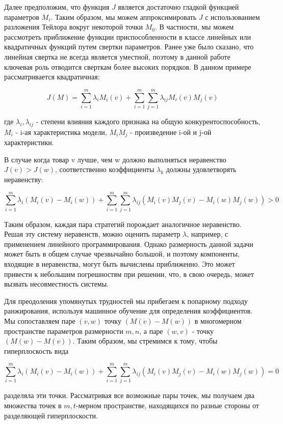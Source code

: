\documentclass[14pt, a4paper]{extarticle}
\begin{document}
  Далее предположим, что функция \( J \) является достаточно гладкой функцией параметров \( M_i \). Таким образом, мы можем аппроксимировать \( J \) с использованием разложения Тейлора вокруг некоторой точки \( M_0 \). В частности, мы можем рассмотреть приближение функции приспособленности в классе линейных или квадратичных функций путем свертки параметров. Ранее уже было сказано, что линейная свертка не всегда является уместной, поэтому в данной работе ключевая роль отводится сверткам более высоких порядков. В данном примере рассматривается квадратичная:
  
  \[
  J(M) = \sum_{i=1}^m \lambda_i M_i(v) + \sum_{i=1}^m \sum_{j=1}^m \lambda_{ij} M_i(v) M_j(v)
  \]
  
  где \( \lambda_i, \lambda_{ij} \) - степени влияния каждого признака на общую конкурентоспособность, \( M_i \) - i-ая характеристика модели, \( M_iM_j \) - произведение i-ой и j-ой характеристики.
  
  В случае когда товар v лучше, чем w должно выполняться неравенство \( J(v) > J(w) \), соответственно коэффициенты \( \lambda_k \) должны удовлетворять неравенству:
  
  \[
  \sum_{i=1}^m \lambda_i(M_i(v) - M_i(w)) + \sum_{i=1}^m \sum_{j=1}^m \lambda_{ij} (M_i(v) M_j(v) - M_i(w) M_j(w)) > 0
  \]
  
  Таким образом, каждая пара стратегий порождает аналогичное неравенство. Решая эту систему неравенств, можно оценить параметр \( \lambda \), например, с применением линейного программирования. Однако размерность данной задачи может быть в общем случае чрезвычайно большой, и поэтому компоненты, входящие в неравенства, могут быть вычислены приближенно. Это может привести к небольшим погрешностям при решении, что, в свою очередь, может вызвать несовместность системы.

Для преодоления упомянутых трудностей мы прибегаем к попарному подходу ранжирования, используя машинное обучение для определения коэффициентов. Мы сопоставляем паре \( (v, w) \) точку \( (M(v) - M(w)) \) в многомерном пространстве параметров размерности \( m, n \), а паре \( (w, v) \) - точку \( (M(w) - M(v)) \). Таким образом, мы стремимся к тому, чтобы гиперплоскость вида

\[
\sum_{i=1}^m \lambda_i(M_i(v) - M_i(w)) + \sum_{i=1}^m \sum_{j=1}^m \lambda_{ij}(M_i(v)M_j(v) - M_i(w)M_j(w)) = 0
\]

разделяла эти точки. Рассматривая все возможные пары точек, мы получаем два множества точек в \( m, t \)-мерном пространстве, находящихся по разные стороны от разделяющей гиперплоскости.
\end{document}
